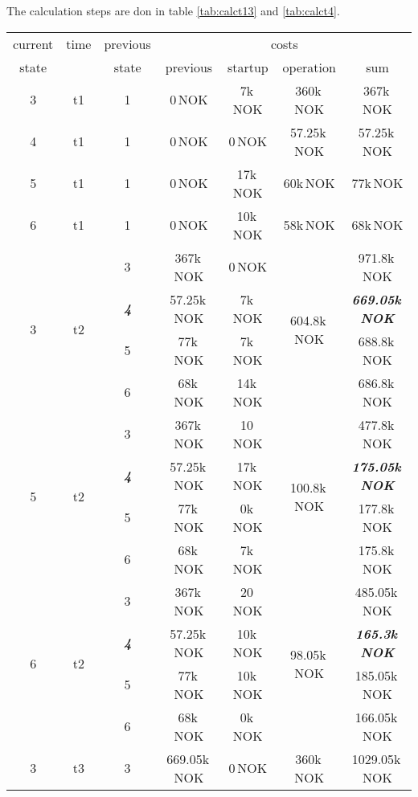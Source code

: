 \documentclass{article}
\begin{document}
The calculation steps are don in table \ref{tab:calct13} and \ref{tab:calct4}.
	\begin{table}[hbt!]
\begin{center}
\begin{tabular}[h]{|c|c|c||c|c|c||c|}
\hline
current & time & previous   & \multicolumn{4}{|c|}{costs}\\
\cline{4-7}
state  		&      	&  state    &   previous    	&    startup   		& operation 		&  sum \\
\hline
\hline
 3			&	t1	&	1		&		0\,NOK		&	7k\,NOK			&	360k\,NOK		& 367k\,NOK\\
\hline
 4			&	t1	&	1		&		0\,NOK		&	0\,NOK			&	57.25k\,NOK		& 57.25k\,NOK\\
\hline
 5			&	t1	&	1		&		0\,NOK		&	17k\,NOK		&	60k\,NOK		& 77k\,NOK\\
\hline
 6			&	t1	&	1		&		0\,NOK		&	10k\,NOK		&	58k\,NOK		& 68k\,NOK\\
\hline
\hline
\multirow{4}{*}{3} & \multirow{4}{*}{t2} 
	&	3		&		367k\,NOK	&	0\,NOK			&	\multirow{4}{*}{604.8k\,NOK}		&	971.8k\,NOK\\
&	&	\textit{\textbf{4}}		&		57.25k\,NOK	&	7k\,NOK			&					&	\textit{\textbf{669.05k\,NOK}}\\
&	&	5		&		77k\,NOK	&	7k\,NOK			&										&	688.8k\,NOK\\
&	&	6		&		68k\,NOK	&	14k\,NOK		&										&	686.8k\,NOK\\
\hline
\multirow{4}{*}{5} & \multirow{4}{*}{t2}	
	&	3		&		367k\,NOK	&	10\,NOK			&	\multirow{4}{*}{100.8k\,NOK}		&	477.8k\,NOK\\
&	&	\textit{\textbf{4}}		&		57.25k\,NOK	&	17k\,NOK		&					&	\textit{\textbf{175.05k\,NOK}}\\
&	&	5		&		77k\,NOK	&	0k\,NOK			&										&	177.8k\,NOK\\
&	&	6		&		68k\,NOK	&	7k\,NOK			&										&	175.8k\,NOK\\
\hline
\multirow{4}{*}{6} & \multirow{4}{*}{t2}	
	&	3		&		367k\,NOK	&	20\,NOK			&	\multirow{4}{*}{98.05k\,NOK}		&	485.05k\,NOK\\
&	&	\textit{\textbf{4}}		&		57.25k\,NOK	&	10k\,NOK		&					&	\textit{\textbf{165.3k\,NOK}}\\
&	&	5		&		77k\,NOK	&	10k\,NOK		&										&	185.05k\,NOK\\
&	&	6		&		68k\,NOK	&	0k\,NOK			&										&	166.05k\,NOK\\
\hline
\hline
\multirow{3}{*}{3} & \multirow{3}{*}{t3}	
	&	3		&		669.05k\,NOK	&	0\,NOK			&	\multirow{3}{*}{360k\,NOK}			&	1029.05k\,NOK\\

\end{tabular}
\end{center}
\end{table}
\end{document}
